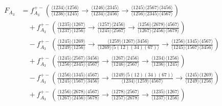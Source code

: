 \documentclass[11pt]{article}
\begin{document}
\begin{align}
F_{A_3}  &= f_{A_3}^{+-} \left( \tfrac{\langle 1234 \rangle \langle 1256 \rangle}{\langle 1236 \rangle \langle 1245 \rangle} \! 
    \to \! \tfrac{\langle 1246\rangle \langle 2345 \rangle}{\langle 1234 \rangle \langle 2456 \rangle} \! 
    \to \! \tfrac{\langle 1245\rangle \langle 2567 \rangle \langle 3456 \rangle }{\langle 1256 \rangle \langle 2345 \rangle \langle 4567 \rangle} \right) \nonumber \\
&\quad+ f_{A_3}^{+-} \left( \tfrac{\langle 1235 \rangle \langle 1267 \rangle}{\langle 1237 \rangle  \langle 1256 \rangle} \! 
    \to \! \tfrac{\langle 1257 \rangle \langle 2456 \rangle}{\langle 1245 \rangle \langle 2567 \rangle} \! 
    \to \! \tfrac{\langle 1256 \rangle \langle 2678 \rangle \langle 4567 \rangle}{\langle 1267 \rangle \langle 2456 \rangle \langle 5678 \rangle} \right) \nonumber \\
&\quad- f_{A_3}^{+-} \left( \tfrac{\langle 1245 \rangle \langle 1269 \rangle}{\langle 1249 \rangle \langle 1256 \rangle} \! 
    \to \! \tfrac{\langle 1259 \rangle \langle 1267 \rangle \langle 3456 \rangle}{\langle 1269 \rangle \langle 5(12)(34)(67) \rangle} \! 
    \to \! \tfrac{\langle 1256 \rangle \langle 1345 \rangle \langle 4567 \rangle}{\langle 1245 \rangle \langle 1567 \rangle \langle 3456 \rangle} \right) \nonumber \\
&\quad+ f_{A_3}^{+-} \left( \tfrac{\langle 1245 \rangle \langle 2567 \rangle \langle 3456 \rangle}{\langle 1256 \rangle \langle 2345 \rangle \langle 4567 \rangle} \! 
    \to \! \tfrac{\langle 1267 \rangle  \langle 2456 \rangle}{\langle 1246 \rangle \langle 2567 \rangle} \! 
    \to \! \tfrac{\langle 1234 \rangle  \langle 1256 \rangle}{\langle 1236 \rangle \langle 1245 \rangle} \right) \nonumber \\
&\quad- f_{A_3}^{+-} \left(\tfrac{\langle 1256 \rangle \langle 1345 \rangle \langle 4567 \rangle}{\langle 1245 \rangle \langle 1567 \rangle \langle 3456 \rangle} \! 
    \to \! \tfrac{\langle 1249 \rangle \langle 5(12)(34)(67)\rangle}{\langle 1234 \rangle \langle 1259 \rangle \langle 4567 \rangle} \! 
    \to \! \tfrac{\langle 1245 \rangle \langle 1269 \rangle}{\langle 1249 \rangle \langle 1256 \rangle} \right) \\ 
&\quad+ f_{A_3}^{+-} \left( \tfrac{\langle 1256 \rangle \langle 2678 \rangle \langle 4567 \rangle}{\langle 1267 \rangle \langle 2456 \rangle \langle 5678 \rangle} \! 
    \to \! \tfrac{\langle 1278 \rangle \langle 2567 \rangle}{\langle 1257 \rangle \langle 2678 \rangle} \! 
    \to \! \tfrac{\langle 1235 \rangle \langle 1267 \rangle}{\langle 1237 \rangle \langle 1256 \rangle} \right) \nonumber \\

\end{align}
\end{document}
